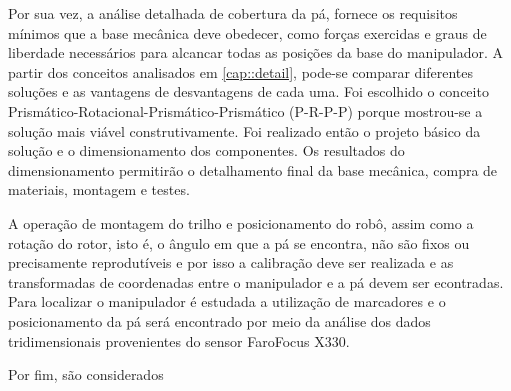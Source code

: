 Por sua vez, a análise detalhada de cobertura da pá, fornece os requisitos
mínimos que a base mecânica deve obedecer, como forças exercidas e graus de liberdade necessários
para alcancar todas as posições da base do manipulador. A partir dos conceitos
analisados em \ref{cap::detail}, pode-se comparar diferentes soluções e as
vantagens de desvantagens de cada uma. Foi escolhido o conceito
Prismático-Rotacional-Prismático-Prismático (P-R-P-P) porque mostrou-se a
solução mais viável construtivamente. Foi realizado então o projeto básico da
solução e o dimensionamento dos componentes. Os resultados do dimensionamento
permitirão o detalhamento final da base mecânica, compra de materiais, montagem
e testes.

A operação de montagem do trilho e posicionamento do robô, assim como
a rotação do rotor, isto é, o ângulo em que a pá se encontra, não são fixos ou
precisamente reprodutíveis e por isso a calibração deve ser realizada e as
transformadas de coordenadas entre o manipulador e a pá devem ser econtradas.
Para localizar o manipulador é estudada a utilização de marcadores e o
posicionamento da pá será encontrado por meio da análise dos dados
tridimensionais provenientes do sensor Faro\textregistered Focus X330.

Por fim, são considerados 